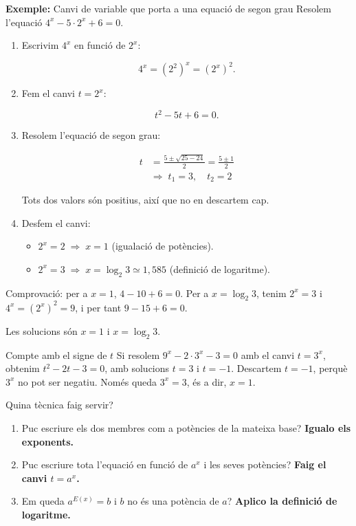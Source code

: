\begin{exemple}{\textbf{Exemple:} Canvi de variable que porta a una equació de segon grau}
Resolem l'equació $4^x - 5\cdot 2^x + 6 = 0$.

\begin{enumerate}
\item Escrivim $4^x$ en funció de $2^x$:

\[
4^x = \left(2^2\right)^x = \left(2^x\right)^2.
\]
\item Fem el canvi $t=2^x$:

\[
t^2 - 5t + 6 = 0.
\]
\item Resolem l'equació de segon grau:

\[
\begin{aligned}
t&=\frac{5\pm\sqrt{25-24}}{2}=\frac{5\pm 1}{2}\\
&\Rightarrow\; t_1=3,\quad t_2=2
\end{aligned}
\]

Tots dos valors són positius, així que no en descartem cap.
\item Desfem el canvi:

\begin{itemize}
\item $2^x = 2 \;\Rightarrow\; x=1$ (igualació de potències).
\item $2^x = 3 \;\Rightarrow\; x=\log_2 3 \simeq 1{,}585$ (definició de logaritme).
\end{itemize}
\end{enumerate}

Comprovació: per a $x=1$, $4-10+6=0$. Per a $x=\log_2 3$, tenim $2^x=3$ i $4^x=\left(2^x\right)^2=9$, i per tant $9-15+6=0$.

Les solucions són $x=1$ i $x=\log_2 3$.
\end{exemple}

\begin{nota}{Compte amb el signe de $t$}
Si resolem $9^x - 2\cdot 3^x - 3 = 0$ amb el canvi $t=3^x$, obtenim $t^2-2t-3=0$, amb solucions $t=3$ i $t=-1$. Descartem $t=-1$, perquè $3^x$ no pot ser negatiu. Només queda $3^x=3$, és a dir, $x=1$.
\end{nota}

\begin{nota}{Quina tècnica faig servir?}
\begin{enumerate}
\item Puc escriure els dos membres com a potències de la mateixa base? \textbf{Igualo els exponents.}
\item Puc escriure tota l'equació en funció de $a^x$ i les seves potències? \textbf{Faig el canvi $t=a^x$.}
\item Em queda $a^{E(x)}=b$ i $b$ no és una potència de $a$? \textbf{Aplico la definició de logaritme.}
\end{enumerate}
\end{nota}

